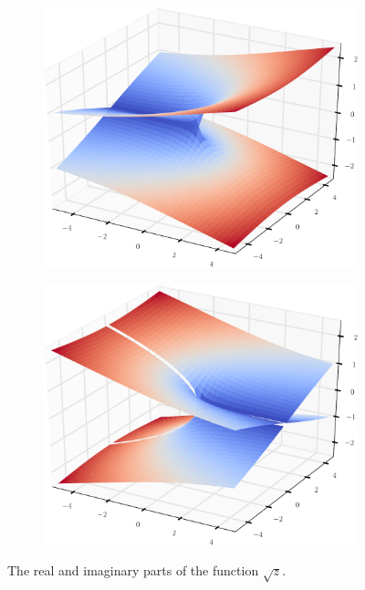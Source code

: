 \begin{figure}
\begin{subfigure}{.49\textwidth}
\includegraphics[width=\textwidth]{sqrt_riemann_surface_1}
\end{subfigure}
\begin{subfigure}{.49\textwidth}
\includegraphics[width=\textwidth]{sqrt_riemann_surface_2}
\end{subfigure}
\caption{The real and imaginary parts of the function $\sqrt{z}$.}
\label{fig:sqrt_riemann_surface}
\end{figure}

